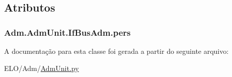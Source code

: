 \subsection{Atributos}
\hypertarget{classAdm_1_1AdmUnit_1_1IfBusAdm_a95ea8f39fbbcddf44822e1614c712bfe}{
\subsubsection[{pers}]{\setlength{\rightskip}{0pt plus 5cm}Adm.\-Adm\-Unit.\-If\-Bus\-Adm.\-pers}}\label{classAdm_1_1AdmUnit_1_1IfBusAdm_a95ea8f39fbbcddf44822e1614c712bfe}


A documentação para esta classe foi gerada a partir do seguinte arquivo\-:\begin{DoxyCompactItemize}
\item 
E\-L\-O/\-Adm/\hyperlink{AdmUnit_8py}{Adm\-Unit.\-py}\end{DoxyCompactItemize}
